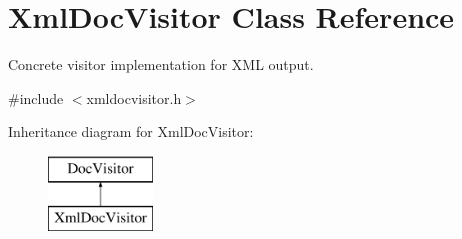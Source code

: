 \hypertarget{class_xml_doc_visitor}{}\section{Xml\+Doc\+Visitor Class Reference}
\label{class_xml_doc_visitor}


Concrete visitor implementation for X\+ML output.  




{\ttfamily \#include $<$xmldocvisitor.\+h$>$}

Inheritance diagram for Xml\+Doc\+Visitor\+:\begin{figure}[H]
\begin{center}
\leavevmode
\includegraphics[height=2.000000cm]{class_xml_doc_visitor}
\end{center}
\end{figure}
